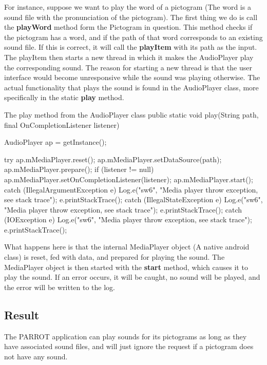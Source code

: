 For instance, suppose we want to play the word of a pictogram (The word is a sound file with the pronunciation of the pictogram). 
The first thing we do is call the \textbf{playWord} method form the Pictogram in question. 
This method checks if the pictogram has a word, and if the path of that word corresponds to an existing sound file. 
If this is correct, it will call the \textbf{playItem} with its path as the input.\newline 
The playItem then starts a new thread in which it makes the AudioPlayer play the corresponding sound. 
The reason for starting a new thread is that the user interface would become unresponsive while the sound was playing otherwise.\newline
The actual functionality that plays the sound is found in the AudioPlayer class, more specifically  in the static \textbf{play} method.\newline

\begin{source}[{audioplay}]{The play method from the AudioPlayer class}
	public static void play(String path, final OnCompletionListener listener)
	{
		AudioPlayer ap = getInstance();
		 
		try {
			ap.mMediaPlayer.reset();
			ap.mMediaPlayer.setDataSource(path);
			ap.mMediaPlayer.prepare();
			if (listener != null)
				ap.mMediaPlayer.setOnCompletionListener(listener);
			ap.mMediaPlayer.start(); 
		} catch (IllegalArgumentException e) {
			Log.e("sw6", "Media player throw exception, see stack trace");
			e.printStackTrace();
		} catch (IllegalStateException e) {
			Log.e("sw6", "Media player throw exception, see stack trace");
			e.printStackTrace();
		} catch (IOException e) {
			Log.e("sw6", "Media player throw exception, see stack trace");
			e.printStackTrace();
		} 
	}
\end{source}

What happens here is that the internal MediaPlayer object (A native android class) is reset, fed with data, and prepared for playing the sound. The MediaPlayer object is then started with the \textbf{start} method, which causes it to play the sound. If an error occurs, it will be caught, no sound will be played, and the error will be written to the log.\newline

\subsection*{Result}
The PARROT application can play sounds for its pictograms as long as they have associated sound files, and will just ignore the request if a pictogram does not have any sound.

